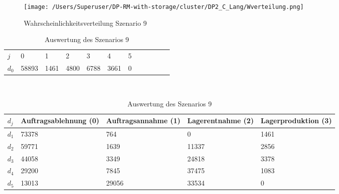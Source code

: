\begin{figure}[h!]
  \begin{center}
    \texttt{[image: /Users/Superuser/DP-RM-with-storage/cluster/DP2\_C\_Lang/Wverteilung.png]}
    \caption{Wahrscheinlichkeitsverteilung Szenario 9}  \label{SB9}
  \end{center}
\end{figure}

\begin{table}[h!]
\renewcommand{\arraystretch}{1.5}
  \begin{center}
    \caption{Auswertung des Szenarios 9}  \label{AS9}
    \vspace*{3mm}
    \begin{tabular}{l l l l l l l l l l l l }  \hline 
         $j$ & 0 & 1  & 2 & 3 & 4  & 5   \\  
$d_{0}$ &  58893 &  1461 &  4800 &  6788 &  3661 &  0 \\
    \end{tabular} \\[3mm]
        \begin{tabular}{ l p{2.5cm} p{2.5cm} p{2.5cm} p{2.5cm} }   \hline    %
    $d_j$ & Auftrags\-ablehnung (0) & Auftrags\-annahme (1)  & Lager\-entnahme (2) & Lager\-produktion (3)\\\hline 
$d_1$ &  73378 &    764 &    0 &  1461 \\
$d_2$ &  59771 &   1639 &  11337 &  2856 \\
$d_3$ &  44058 &   3349 &  24818 &  3378 \\
$d_4$ &  29200 &   7845 &  37475 &  1083 \\
$d_5$ &  13013 &  29056 &  33534 &   0 \\
          \hline
   \end{tabular} \\[3mm]
     \end{center}
\end{table}






